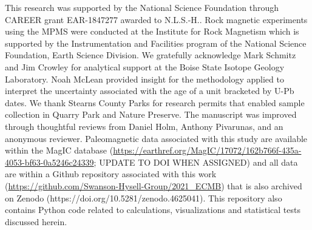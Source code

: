 \documentclass[draft]{agujournal2019}
\begin{document}


%
%
%
%
%
%
%
%


\acknowledgments
This research was supported by the National Science Foundation through CAREER grant EAR-1847277 awarded to N.L.S.-H.. Rock magnetic experiments using the MPMS were conducted at the Institute for Rock Magnetism which is supported by the Instrumentation and Facilities program of the National Science Foundation, Earth Science Division. We gratefully acknowledge Mark Schmitz and Jim Crowley for analytical support at the Boise State Isotope Geology Laboratory. Noah McLean provided insight for the methodology applied to interpret the uncertainty associated with the age of a unit bracketed by U-Pb dates. We thank Stearns County Parks for research permits that enabled sample collection in Quarry Park and Nature Preserve. The manuscript was improved through thoughtful reviews from Daniel Holm, Anthony Pivarunas, and an anonymous reviewer. Paleomagnetic data associated with this study are available within the MagIC database (\url{https://earthref.org/MagIC/17072/162b766f-435a-4053-bf63-0a5246c24339}; UPDATE TO DOI WHEN ASSIGNED) and all data are within a Github repository associated with this work (\url{https://github.com/Swanson-Hysell-Group/2021_ECMB}) that is also archived on Zenodo (https://doi.org/10.5281/zenodo.4625041). This repository also contains Python code related to calculations, visualizations and statistical tests discussed herein.  
\end{document}
